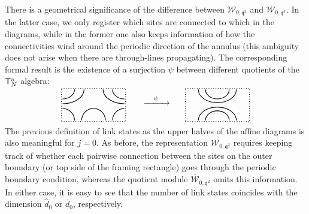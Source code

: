 \documentclass[a4paper,10pt]{article}
\newcommand{\q}{\mathfrak{q}}
\newcommand{\aSt}{\mathcal{W}}
\newcommand{\AStTL}[2]{\aSt_{#1,#2}}
\newcommand{\bAStTL}[2]{\overline{\mathcal{W}}_{#1,#2}}
\newcommand{\ATL}[1]{\mathsf{T}^{\rm a}_{#1}}
\begin{document}
There is a geometrical significance of the difference between $\AStTL{0}{\q^2}$ and $\bAStTL{0}{\q^2}$. In the latter case, we only register which sites are connected to which in the diagrams, while in the former one also keeps information of how the connectivities wind around the periodic direction of the annulus (this ambiguity does not arise when there are through-lines propagating). The corresponding formal result is the existence of a surjection $\psi$ between different quotients of the $\ATL{N}$ algebra:
%
\begin{equation}\label{psi-ex}
  \xymatrix@C=8pt@R=1pt@M=-5pt@W=-2pt{
  &&	\mbox{}\quad\xrightarrow{{\mbox{}\quad\psi\quad} }\quad &\\
  & {
 \begin{tikzpicture}
 	\draw[thick, dotted] (-0.05,0.5) arc (0:10:0 and -7.5);
 	\draw[thick, dotted] (-0.05,0.55) -- (2.65,0.55);
 	\draw[thick, dotted] (2.65,0.5) arc (0:10:0 and -7.5);
	\draw[thick, dotted] (-0.05,-0.85) -- (2.65,-0.85);
	\draw[thick] (0,0.1) arc (-90:0:0.5 and 0.4);
	\draw[thick] (0,-0.1) arc (-90:0:0.9 and 0.6);
	\draw[thick] (2.6,-0.1) arc (-90:0:-0.9 and 0.6);
	\draw[thick] (2.6,0.1) arc (-90:0:-0.5 and 0.4);
	\draw[thick] (0.5,-0.8) arc (0:90:0.5 and 0.5);
	\draw[thick] (1.8,-0.8) arc (0:180:0.5 and 0.5);
	\draw[thick] (2.1,-0.8) arc (0:90:-0.5 and 0.5);
	\end{tikzpicture}
\quad}&
	& {	\quad
  \begin{tikzpicture}
 	\draw[thick, dotted] (-0.05,0.5) arc (0:10:0 and -7.5);
 	\draw[thick, dotted] (-0.05,0.55) -- (2.65,0.55);
 	\draw[thick, dotted] (2.65,0.5) arc (0:10:0 and -7.5);
	\draw[thick, dotted] (-0.05,-0.85) -- (2.65,-0.85);
	\draw[thick] (0.5,0.5) arc (-180:0:0.8 and 0.56);
	\draw[thick] (0.8,0.5) arc (-180:0:0.5 and 0.4);
	\draw[thick] (2.1,-0.8) arc (0:180:0.8 and 0.56);
	\draw[thick] (1.8,-0.8) arc (0:180:0.5 and 0.4);
	\end{tikzpicture}}
  }
\end{equation}
%
The previous definition of link states as the upper halves of the affine diagrams is also meaningful for $j=0$. As before, the representation $\AStTL{0}{\q^2}$ requires keeping
track of whether each pairwise connection between the sites on the outer boundary (or top side of the framing rectangle) goes through the periodic boundary condition, whereas the quotient module $\bAStTL{0}{\q^2}$ omits this information. In either case, it is easy to see that the number of link states coincides with the dimension $\hat{d}_0$ or $\bar{d}_0$, respectively.
\end{document}
